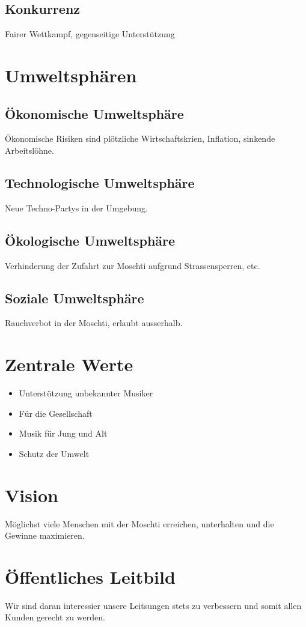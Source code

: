 \documentclass[a4paper, titlepage]{article}
\begin{document}
\subsection{Konkurrenz}
Fairer Wettkampf, gegenseitige Unterstützung

\section{Umweltsphären}
\subsection{Ökonomische Umweltsphäre}
Ökonomische Risiken sind plötzliche Wirtschaftskrien, Inflation, sinkende Arbeitslöhne.
\subsection{Technologische Umweltsphäre}
Neue Techno-Partys in der Umgebung.
\subsection{Ökologische Umweltsphäre}
Verhinderung der Zufahrt zur Moschti aufgrund Strassensperren, etc.
\subsection{Soziale Umweltsphäre}
Rauchverbot in der Moschti, erlaubt ausserhalb. 
\section{Zentrale Werte}
\begin{itemize}
  \item Unterstützung unbekannter Musiker
  \item Für die Gesellschaft
  \item Musik für Jung und Alt
  \item Schutz der Umwelt
\end{itemize}
\section{Vision}
Möglichst viele Menschen mit der Moschti erreichen, unterhalten und die Gewinne maximieren. 
\section{Öffentliches Leitbild}
Wir sind daran interessier unsere Leitsungen stets zu verbessern und somit allen Kunden gerecht zu werden.
\end{document}
